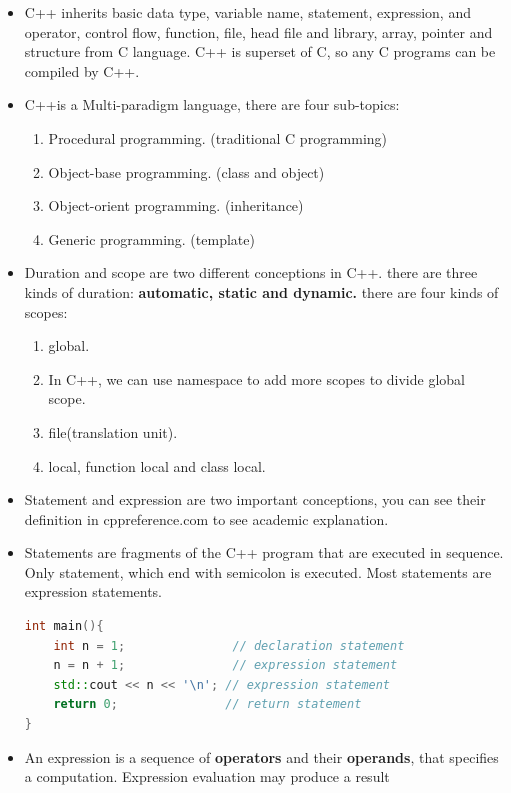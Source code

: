 \documentclass[a4paper,12pt,twoside]{book}
\begin{document}
\begin{itemize}
    \item C++ inherits basic data type, variable name, statement, expression, and operator, control flow, function, file, head file and library, array, pointer and structure from C language. C++ is superset of C, so any C programs can be compiled by C++.

    
    \item C++is a Multi-paradigm language, there are four sub-topics: 
    
    \begin{enumerate}
        \item Procedural programming. (traditional C programming)
        \item Object-base programming. (class and object)
        \item Object-orient programming. (inheritance)
        \item Generic programming. (template)
    \end{enumerate}
    
    \item Duration and scope are two different conceptions in C++. there are three kinds of duration: \textbf{automatic, static and dynamic.} there are four kinds of scopes:
    \begin{enumerate}
        \item global.
        \item In C++, we can use namespace to add more scopes to divide global scope.
        \item file(translation unit).
        \item local, function local and class local. 
    \end{enumerate}
    
    \item Statement and expression are two important conceptions, you can see their definition in cppreference.com to see academic explanation.
    
    \item Statements are fragments of the C++ program that are executed in sequence. Only statement, which end with semicolon is executed. Most statements are expression statements. 
\begin{lstlisting}[frame=single, language=c++]    
int main(){
	int n = 1;               // declaration statement
	n = n + 1;               // expression statement
	std::cout << n << '\n'; // expression statement
	return 0;               // return statement
}
\end{lstlisting}
	\item An expression is a sequence of \textbf{operators} and their \textbf{operands}, that specifies a computation. Expression evaluation may produce a result


\end{itemize}
\end{document}
